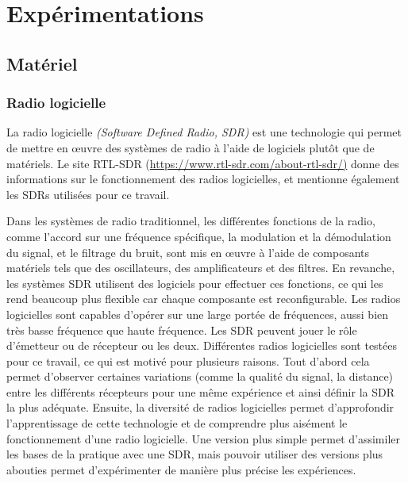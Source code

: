 \chapter{Expérimentations}


\renewcommand{\leftmark}{EXPERIMENTATIONS}

\section{Matériel}

\subsection{Radio logicielle}

La radio logicielle \textit{(Software Defined Radio, SDR)} est une technologie qui permet de mettre en œuvre des systèmes de radio à l'aide de logiciels plutôt que de matériels. Le site RTL-SDR (\href{https://www.rtl-sdr.com/about-rtl-sdr/}{https://www.rtl-sdr.com/about-rtl-sdr/)} donne des informations sur le fonctionnement des radios logicielles, et mentionne également les SDRs utilisées pour ce travail.

\vspace{0.1cm}

Dans les systèmes de radio traditionnel, les différentes fonctions de la radio, comme l'accord sur une fréquence spécifique, la modulation et la démodulation du signal, et le filtrage du bruit, sont mis en œuvre à l'aide de composants matériels tels que des oscillateurs, des amplificateurs et des filtres. En revanche, les systèmes SDR utilisent des logiciels pour effectuer ces fonctions, ce qui les rend beaucoup plus flexible car chaque composante est reconfigurable. Les radios logicielles sont capables d'opérer sur une large portée de fréquences, aussi bien très basse fréquence que haute fréquence.
Les SDR peuvent jouer le rôle d'émetteur ou de récepteur ou les deux. Différentes radios logicielles sont testées pour ce travail, ce qui est motivé pour plusieurs raisons. Tout d'abord cela permet d'observer certaines variations (comme la qualité du signal, la distance) entre les différents récepteurs pour une même expérience et ainsi définir la SDR la plus adéquate. Ensuite, la diversité de radios logicielles permet d'approfondir l'apprentissage de cette technologie et de comprendre plus aisément le fonctionnement d'une radio logicielle. Une version plus simple permet d'assimiler les bases de la pratique avec une SDR, mais pouvoir utiliser des versions plus abouties permet d'expérimenter de manière plus précise les expériences.

